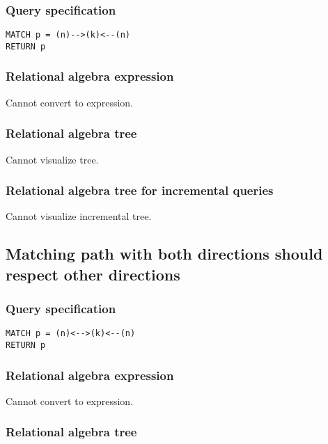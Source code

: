 \subsubsection*{Query specification}

\begin{lstlisting}
MATCH p = (n)-->(k)<--(n)
RETURN p
\end{lstlisting}

\subsubsection*{Relational algebra expression}

Cannot convert to expression.

\subsubsection*{Relational algebra tree}

Cannot visualize tree.

\subsubsection*{Relational algebra tree for incremental queries}

Cannot visualize incremental tree.

\subsection{Matching path with both directions should respect other directions}

\subsubsection*{Query specification}

\begin{lstlisting}
MATCH p = (n)<-->(k)<--(n)
RETURN p
\end{lstlisting}

\subsubsection*{Relational algebra expression}

Cannot convert to expression.

\subsubsection*{Relational algebra tree}

